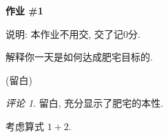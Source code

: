 \documentclass{exam}
\theoremstyle{remark}
\newtheorem*{remark}{评论}
\newenvironment{hint}{%
    \ifvmode
        \ignorespaces
    \else
        \quad
    \fi
    \begin{tikzpicture}[baseline=(H.base), every node/.style={signal, draw, very thin, signal to=east, signal from=nowhere, signal pointer angle=120, inner sep=2pt}]
        \node[anchor=mid west] (H) at (0,0) {\heiti\footnotesize 提示};
    \end{tikzpicture}
}{}
\begin{document}
    \vspace*{0in}
    \begin{center}
        \Huge\bf 作业 \#1 %
    \end{center}
    
    \unframedsolutions %
    \SolutionEmphasis{\fangsong} %
    \printanswers %
    
    {\small\kaishu 说明: 本作业不用交, 交了记0分.}

    \begin{questions}
        \question[5] 解释你一天是如何达成肥宅目标的.
        \begin{solution}
            (留白)
        \end{solution}
        \begin{remark}
            留白, 充分显示了肥宅的本性.
        \end{remark}

        \question[5] 考虑算式 $1 + 2$.
        \begin{solution}
        \end{solution}
    \end{questions}
\end{document}
